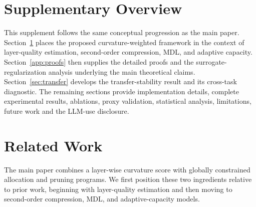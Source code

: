 \documentclass[accepted]{uai2026}%
\theoremstyle{remark}%
\begin{document}



\newpage

\onecolumn

\maketitle

\section*{Supplementary Overview}
This supplement follows the same conceptual progression as the main paper.
Section~\ref{sec:related_work} places the proposed curvature-weighted framework
in the context of layer-quality estimation, second-order compression, MDL, and
adaptive capacity. Section~\ref{app:proofs} then supplies the detailed proofs
and the surrogate-regularization analysis underlying the main theoretical
claims. Section~\ref{sec:transfer} develops the transfer-stability result and
its cross-task diagnostic. The remaining sections provide implementation
details, complete experimental results, ablations, proxy validation, statistical
analysis, limitations, future work and the LLM-use disclosure.

\clearpage
\onecolumn
\setcounter{tocdepth}{2}
\tableofcontents
\clearpage

\appendix


\section{Related Work}
\label{sec:related_work}

The main paper combines a layer-wise curvature score with globally constrained
allocation and pruning programs. We first position these two ingredients
relative to prior work, beginning with layer-quality estimation and then moving
to second-order compression, MDL, and adaptive-capacity models.
\end{document}
